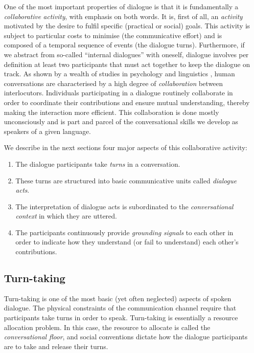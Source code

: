 One of the most important properties of dialogue is that it is fundamentally a \textit{collaborative activity}, with emphasis on both words.  It is, first of all, an \textit{activity} motivated by the desire to fulfil specific (practical or social) goals.  This activity is subject to particular costs to minimise (the communicative effort) and is composed of a temporal sequence of events (the dialogue turns).  Furthermore, if we abstract from so-called ``internal dialogues'' with oneself, dialogue involves per definition at least two participants that must act together to keep the dialogue on track.  As shown by a wealth of studies in psychology and linguistics \citep{Clark1989,Allwood92,Clark96,Garrod2004,Tomasello2005}, human conversations are characterised by a high degree of \textit{collaboration} between interlocutors.  Individuals participating in a dialogue routinely collaborate in order to coordinate their contributions and ensure mutual understanding, thereby making the interaction more efficient. This collaboration is done mostly unconsciously and is part and parcel of the conversational skills we develop as speakers of a given language. 

We describe in the next sections four major aspects of this collaborative activity: \begin{enumerate}
\item The dialogue participants take \textit{turns} in a conversation.
\item These turns are structured into basic communicative units called \textit{dialogue acts}.
\item The interpretation of dialogue acts is subordinated to the \textit{conversational context} in which they are uttered. 
\item The participants continuously provide \textit{grounding signals} to each other in order to indicate how they understand (or fail to understand) each other's contributions.
\end{enumerate}

\subsection{Turn-taking}

Turn-taking is one of the most basic (yet often neglected) aspects of spoken dialogue. The physical constraints of the communication channel require that participants take turns in order to speak.   Turn-taking is essentially a resource allocation problem.  In this case, the resource to allocate is called the \textit{conversational floor}, and social conventions dictate how the dialogue participants are to take and release their turns. 

